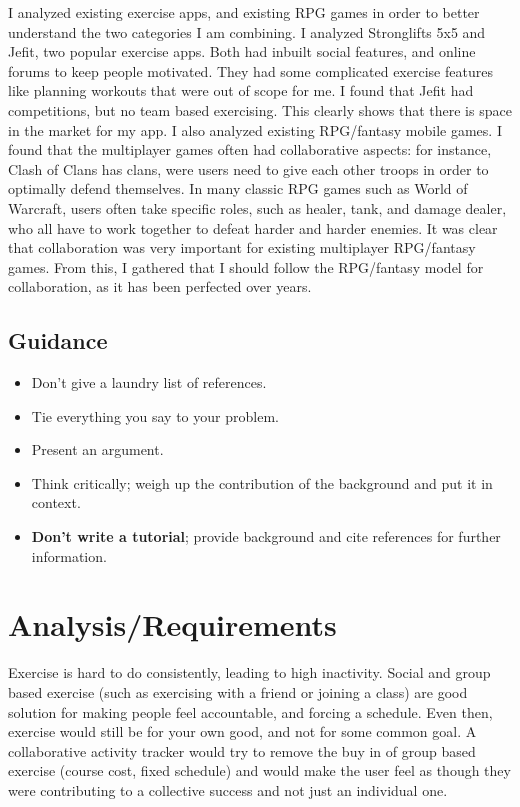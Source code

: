 \documentclass{l4proj}
\begin{document}
I analyzed existing exercise apps, and existing RPG games in order to better understand the two categories I am combining. I analyzed Stronglifts 5x5 and Jefit, two popular exercise apps. Both had inbuilt social features, and online forums to keep people motivated. They had some complicated exercise features like planning workouts that were out of scope for me. I found that Jefit had competitions, but no team based exercising. This clearly shows that there is space in the market for my app. I also analyzed existing RPG/fantasy mobile games. I found that the multiplayer games often had collaborative aspects: for instance, Clash of Clans has clans, were users need to give each other troops in order to optimally defend themselves. In many classic RPG games such as World of Warcraft, users often take specific roles, such as healer, tank, and damage dealer, who all have to work together to defeat harder and harder enemies. It was clear that collaboration was very important for existing multiplayer RPG/fantasy games. From this, I gathered that I should follow the RPG/fantasy model for collaboration, as it has been perfected over years.
\section{Guidance}
\begin{itemize}    
    \item
      Don't give a laundry list of references.
    \item
      Tie everything you say to your problem.
    \item
      Present an argument.
    \item Think critically; weigh up the contribution of the background and put it in context.    
    \item
      \textbf{Don't write a tutorial}; provide background and cite
      references for further information.
\end{itemize}

\chapter{Analysis/Requirements}
Exercise is hard to do consistently, leading to high inactivity. Social and group based exercise (such as exercising with a friend or joining a class) are good solution for making people feel accountable, and forcing a schedule. Even then, exercise would still be for your own good, and not for some common goal. A collaborative activity tracker would try to remove the buy in of group based exercise (course cost, fixed schedule) and would make the user feel as though they were contributing to a collective success and not just an individual one.
\end{document}
